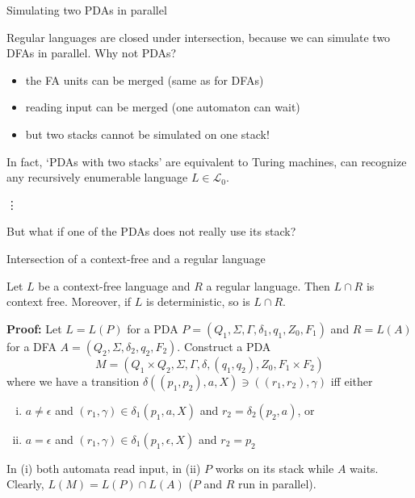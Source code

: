 \documentclass[handout]{beamer}
\begin{document}
\begin{frame}{Simulating two PDAs in parallel}

    Regular languages are closed under intersection, because we can simulate two DFAs in parallel. Why not PDAs?

    \begin{itemize}
        \item the FA units can be merged (same as for DFAs)
        \item reading input can be merged (one automaton can wait)
        \item but two stacks cannot be simulated on one stack!
    \end{itemize}
        
    In fact, `PDAs with two stacks' are equivalent to \alert{Turing machines}, can recognize any \alert{recursively enumerable} language $L\in{\mathcal L}_0$.

    \medskip
    \vdots
    \medskip

    But what if one of the PDAs does not really use its stack?

\end{frame}


\begin{frame}{Intersection of a context-free and a regular language}

    \begin{theorem}
        Let $L$ be a context-free language and $R$ a regular language. Then $L\cap R$ is context free. Moreover, if $L$ is deterministic, so is $L\cap R$.
    \end{theorem}

    \textbf{Proof:} Let $L=L(P)$ for a PDA $P=(Q_1,\Sigma,\Gamma,\delta_1,q_1,Z_0,F_1)$ and $R=L(A)$ for a DFA $A=(Q_2,\Sigma,\delta_2,q_2,F_2)$. Construct a PDA 
    $$
    M=(Q_1\times Q_2,\Sigma,\Gamma,\delta, (q_1,q_2),Z_0,F_1\times F_2)
    $$ 
    where we have a transition $\delta((p_1,p_2),a,X)\ni((r_1,r_2),\gamma)$ iff either
    \begin{enumerate}[(i)]
        \item $a\neq\epsilon$ and $(r_1,\gamma)\in \delta_1(p_1,a,X)$ and $r_2=\delta_2(p_2,a)$, or
        \item $a=\epsilon$ and $(r_1,\gamma)\in \delta_1(p_1,\epsilon,X)$ and $r_2=p_2$
    \end{enumerate}
    In (i) both automata read input, in (ii) $P$ works on its stack while $A$ waits. Clearly, $L(M)=L(P)\cap L(A)$ ($P$ and $R$ run in parallel).\hfill\qedsymbol       

\end{frame}
\end{document}
